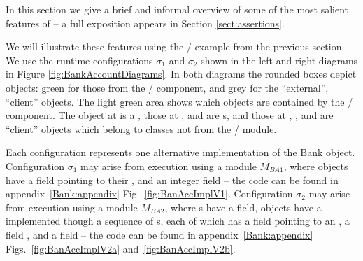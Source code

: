 %
In this section we give a brief and informal  overview of some of the most salient features of  
\Chainmail -- a full exposition appears in Section \ref{sect:assertions}.



 We  will illustrate these features using the  / example from the previous section.
We   use the runtime configurations $\sigma_1$ and $\sigma_2$ 
shown in the left and right diagrams in Figure \ref{fig:BankAccountDiagrams}. 
In both diagrams the rounded boxes depict objects:  green for those from the 
/ component, and grey for the ``external'',  ``client'' objects.
The light green area shows which objects are contained by the / component.
The object at  is a , those at ,  and  are 
s, and those at , ,  and  are 
``client'' objects which belong to classes not from the /  module.

Each configuration represents one alternative implementation of the Bank object.
Configuration  $\sigma_1$ may arise from execution using a module $M_{BA1}$, where   objects
  have a field  pointing to their , and an integer field  
-- the code can be found in appendix~\ref{Bank:appendix} Fig.~\ref{fig:BanAccImplV1}.
Configuration  $\sigma_2$ may arise from execution using a module $M_{BA2}$,  where s have a 
field,   objects  have a  implemented though a sequence of s, each of which has a
 field pointing to an , a field , and a
 field  -- the code can be found in appendix~\ref{Bank:appendix}
Figs.~\ref{fig:BanAccImplV2a} and~\ref{fig:BanAccImplV2b}.

